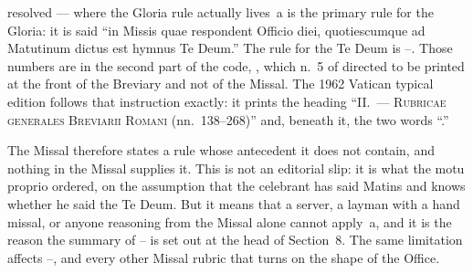 \begin{contested}{resolved --- where the Gloria rule actually lives}
\,a is the primary rule for the Gloria: it is said ``in Missis quae
respondent Officio diei, quotiescumque ad Matutinum dictus est hymnus Te
Deum.'' The rule for the Te Deum is --. Those numbers are in
the second part of the code, , which
n.~5 of  directed to be printed at the front of the
Breviary and not of the Missal. The 1962 Vatican typical edition follows that
instruction exactly: it prints the heading ``II.\ --- \textsc{Rubricae
generales Breviarii Romani} (nn.~138--268)'' and, beneath it, the two words
``.''

The Missal therefore states a rule whose antecedent it does not contain, and
nothing in the Missal supplies it. This is not an editorial slip: it is what
the motu proprio ordered, on the assumption that the celebrant has said Matins
and knows whether he said the Te Deum. But it means that a server, a layman
with a hand missal, or anyone reasoning from the Missal alone cannot apply
\,a, and it is the reason the summary of -- is set out
at the head of Section~8. The same limitation affects --,
 and every other Missal rubric that turns on the shape of the Office.
\end{contested}
